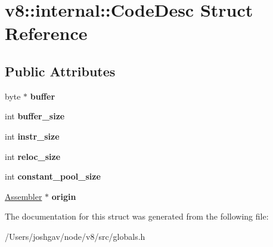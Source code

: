 \hypertarget{structv8_1_1internal_1_1_code_desc}{}\section{v8\+:\+:internal\+:\+:Code\+Desc Struct Reference}
\label{structv8_1_1internal_1_1_code_desc}
\subsection*{Public Attributes}
\begin{DoxyCompactItemize}
\item 
byte $\ast$ {\bfseries buffer}\hypertarget{structv8_1_1internal_1_1_code_desc_a7f81b61966443cefdb7d66bbb0da57bf}{}\label{structv8_1_1internal_1_1_code_desc_a7f81b61966443cefdb7d66bbb0da57bf}

\item 
int {\bfseries buffer\+\_\+size}\hypertarget{structv8_1_1internal_1_1_code_desc_ab886efa479651e14e7e6bc708a4be521}{}\label{structv8_1_1internal_1_1_code_desc_ab886efa479651e14e7e6bc708a4be521}

\item 
int {\bfseries instr\+\_\+size}\hypertarget{structv8_1_1internal_1_1_code_desc_af887603bc5c17ab365f80879c2660727}{}\label{structv8_1_1internal_1_1_code_desc_af887603bc5c17ab365f80879c2660727}

\item 
int {\bfseries reloc\+\_\+size}\hypertarget{structv8_1_1internal_1_1_code_desc_a4ec6827a7510122e162e8849e387f33b}{}\label{structv8_1_1internal_1_1_code_desc_a4ec6827a7510122e162e8849e387f33b}

\item 
int {\bfseries constant\+\_\+pool\+\_\+size}\hypertarget{structv8_1_1internal_1_1_code_desc_afa0584ce34ae1cc2c416453778af3a1b}{}\label{structv8_1_1internal_1_1_code_desc_afa0584ce34ae1cc2c416453778af3a1b}

\item 
\hyperlink{classv8_1_1internal_1_1_assembler}{Assembler} $\ast$ {\bfseries origin}\hypertarget{structv8_1_1internal_1_1_code_desc_a5ea7fab993fb8dbcc98653be2d9792e3}{}\label{structv8_1_1internal_1_1_code_desc_a5ea7fab993fb8dbcc98653be2d9792e3}

\end{DoxyCompactItemize}


The documentation for this struct was generated from the following file\+:\begin{DoxyCompactItemize}
\item 
/\+Users/joshgav/node/v8/src/globals.\+h\end{DoxyCompactItemize}
